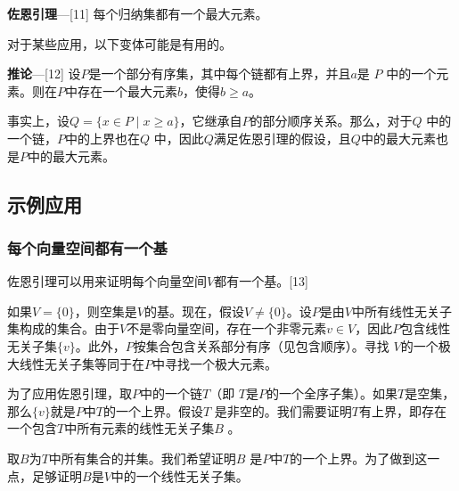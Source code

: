 \textbf{佐恩引理}—[11] 每个归纳集都有一个最大元素。

对于某些应用，以下变体可能是有用的。

\textbf{推论}—[12] 设\( P \)是一个部分有序集，其中每个链都有上界，并且\( a \)是 \( P \) 中的一个元素。则在\( P \)中存在一个最大元素\( b \)，使得\( b \geq a \)。

事实上，设\( Q = \{x \in P \mid x \geq a\} \)，它继承自\( P \)的部分顺序关系。那么，对于\( Q \) 中的一个链，\( P \)中的上界也在\( Q \) 中，因此\( Q \)满足佐恩引理的假设，且\( Q \)中的最大元素也是\( P \)中的最大元素。
\subsection{示例应用}  
\subsubsection{每个向量空间都有一个基} 
佐恩引理可以用来证明每个向量空间\( V \)都有一个基。[13]

如果\( V = \{0\} \)，则空集是\( V \)的基。现在，假设\( V \neq \{0\} \)。设\( P \)是由\( V \)中所有线性无关子集构成的集合。由于\( V \)不是零向量空间，存在一个非零元素\( v \in V \)，因此\( P \)包含线性无关子集\( \{v\} \)。此外，\( P \)按集合包含关系部分有序（见包含顺序）。寻找 \( V \)的一个极大线性无关子集等同于在\( P \)中寻找一个极大元素。

为了应用佐恩引理，取\( P \)中的一个链\( T \)（即 \( T \)是\( P \)的一个全序子集）。如果\( T \)是空集，那么\( \{v\} \)就是\( P \)中\( T \)的一个上界。假设\( T \) 是非空的。我们需要证明\( T \)有上界，即存在一个包含\( T \)中所有元素的线性无关子集\( B \) 。

取\( B \)为\( T \)中所有集合的并集。我们希望证明\( B \) 是\( P \)中\( T \)的一个上界。为了做到这一点，足够证明\( B \)是\( V \)中的一个线性无关子集。
